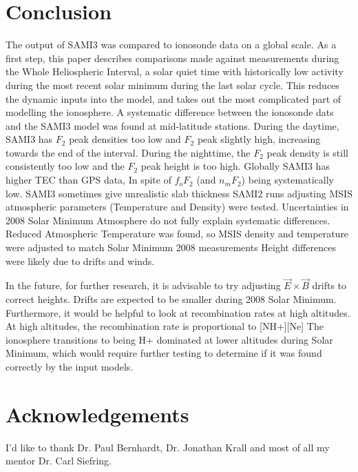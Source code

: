 \documentclass[12pt]{article}
\begin{document}
\section{Conclusion}
  The output of SAMI3 was compared to ionosonde data on a global scale. As a first step, this paper describes comparisons made against measurements during the Whole Heliospheric Interval, a solar quiet time with historically low activity during the most recent solar minimum during the last solar cycle.  This reduces the dynamic inputs into the model, and takes out the most complicated part of modelling the ionosphere. 
  A systematic difference between the ionosonde dats and the SAMI3 model was found at mid-latitude stations. During the daytime, SAMI3 has $F_2$ peak densities too low and $F_2$ peak slightly high, increasing towards the end of the interval.
  During the nighttime, the $F_2$  peak density is still consistently too low and the $F_2$ peak height is too high.
         Globally SAMI3 has higher TEC than GPS data, In spite of $f_oF_2$ (and $n_mF_2$) being systematically low.
         SAMI3 sometimes give unrealistic slab thickness 
   SAMI2 runs adjusting MSIS atmospheric parameters (Temperature and Density) were tested.
        Uncertainties in 2008 Solar Minimum Atmosphere do not fully explain systematic differences.
	Reduced Atmospheric Temperature was found, so MSIS density and temperature were adjusted to match Solar Minimum 2008 measurements
        Height differences were likely due to drifts and winds.
	  
	In the future, for further research, it is advisable to try adjusting $\vec E\times\vec B$ drifts to correct heights.
	    Drifts are expected to be smaller during 2008 Solar Minimum.
        Furthermore, it would be helpful to look at recombination rates at high altitudes.
	   At high altitudes, the recombination rate is proportional to [NH+][Ne]
	   The ionosphere transitions to being H+ dominated at lower altitudes during Solar Minimum, which would require further testing to determine if it was found correctly by the input models.
\section{Acknowledgements}
 I'd like to thank Dr. Paul Bernhardt, Dr. Jonathan Krall and most of all my mentor Dr. Carl Siefring.
\end{document}
